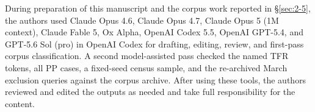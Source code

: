 \documentclass[12pt]{article}
\begin{document}
During preparation of this manuscript and the corpus work reported in §\ref{sec:2-5}, the authors used Claude Opus 4.6, Claude Opus 4.7, Claude Opus 5 (1M context), Claude Fable 5, Ox Alpha, OpenAI Codex 5.5, OpenAI GPT-5.4, and GPT-5.6 Sol (pro) in OpenAI Codex for drafting, editing, review, and first-pass corpus classification. A second model-assisted pass checked the named TFR tokens, all PP cases, a fixed-seed census sample, and the re-archived March exclusion queries against the corpus archive. After using these tools, the authors reviewed and edited the outputs as needed and take full responsibility for the content.

\begingroup
\scriptsize
\printbibliography
\endgroup
\end{document}
